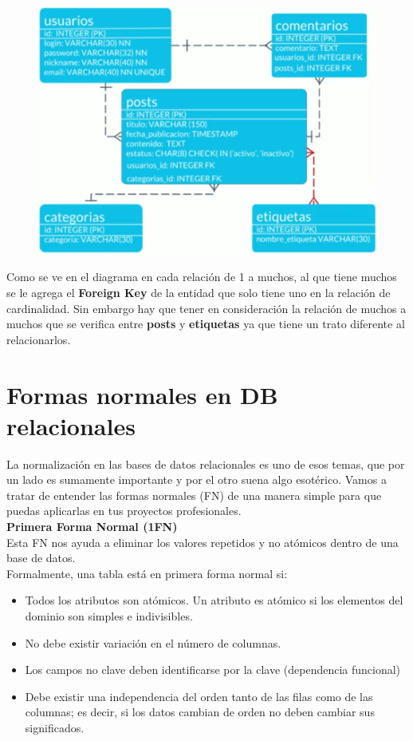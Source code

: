 \documentclass{article}
\begin{document}
\begin{figure}[h!]
    \centering
      \includegraphics[scale=0.45]{./Pictures/028_diagrama_fisico.png}
\end{figure}

Como se ve en el diagrama en cada relación de 1 a muchos, al que tiene muchos
se le agrega el \textbf{Foreign Key} de la entidad que solo tiene uno en la
relación de cardinalidad. Sin embargo hay que tener en consideración la
relación de muchos a muchos que se verifica entre \textbf{posts} y
\textbf{etiquetas} ya que tiene un trato diferente al relacionarlos.


\section{Formas normales en DB relacionales}%
La normalización en las bases de datos relacionales es uno de esos temas, que
por un lado es sumamente importante y por el otro suena algo esotérico. Vamos a
tratar de entender las formas normales (FN) de una manera simple para que
puedas aplicarlas en tus proyectos profesionales.\\

\textbf{Primera Forma Normal (1FN)}\\
Esta FN nos ayuda a eliminar los valores repetidos y no atómicos dentro de una
base de datos.\\

Formalmente, una tabla está en primera forma normal si:

\begin{itemize}
  \item Todos los atributos son atómicos. Un atributo es atómico si los
    elementos del dominio son simples e indivisibles.
  \item No debe existir variación en el número de columnas.
  \item Los campos no clave deben identificarse por la clave (dependencia
    funcional)
  \item Debe existir una independencia del orden tanto de las filas como de las
    columnas; es decir, si los datos cambian de orden no deben cambiar sus
    significados.
\end{itemize}
\end{document}
